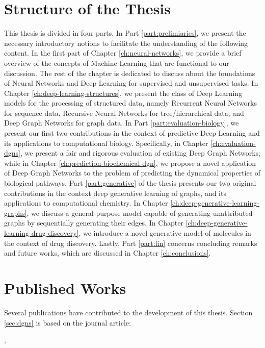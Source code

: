 \section{Structure of the Thesis}
This thesis is divided in four parts. In Part \ref{part:prelimiaries}, we present the necessary introductory notions to facilitate the understanding of the following content. In the first part of Chapter \ref{ch:neural-networks}, we provide a brief overview of the concepts of Machine Learning that are functional to our discussion. The rest of the chapter is dedicated to discuss about the foundations of Neural Networks and Deep Learning for supervised and unsupervised tasks. In Chapter \ref{ch:deep-learning-structures}, we present the class of Deep Learning models for the processing of structured data, namely Recurrent Neural Networks for sequence data, Recursive Neural Networks for tree/hierarchical data, and Deep Graph Networks for graph data. In Part \ref{part:evaluation-biology}, we present our first two contributions in the context of predictive Deep Learning and its applications to computational biology. Specifically, in Chapter \ref{ch:evaluation-dgns}, we present a fair and rigorous evaluation of existing Deep Graph Networks; while in Chapter \ref{ch:prediction-biochemical-dgn}, we propose a novel application of Deep Graph Networks to the problem of predicting the dynamical properties of biological pathways. Part \ref{part:generative} of the thesis presents our two original contributions in the context deep generative learning of graphs, and its applications to computational chemistry. In Chapter \ref{ch:deep-generative-learning-graphs}, we discuss a general-purpose  model capable of generating unattributed graphs by sequentially generating their edges. In Chapter \ref{ch:deep-generative-learning-drug-discovery}, we introduce a novel generative model of molecules in the context of drug discovery. Lastly, Part \ref{part:fin} concerns concluding remarks and future works, which are discussed in Chapter \ref{ch:conclusions}.

\section{Published Works}
Several publications have contributed to the development of this thesis. Section \ref{sec:dgns} is based on the journal article:

\vspace{1em}
,
\vspace{1em}

